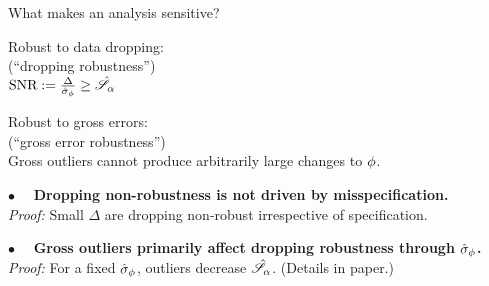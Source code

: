 
\begin{frame}[t]{What makes an analysis sensitive?}
%
\begin{minipage}[t]{0.45\textwidth}
\begin{center}
    Robust to data dropping:\\
    (``dropping robustness'')\\
    \vspace{1em}
    $\textrm{SNR} := \frac{\Delta}{\hat\sigma_{\phi}} \ge \hat{\mathscr{S}}_\alpha$
\end{center}
\end{minipage}
%
\begin{minipage}[t]{0.45\textwidth}
\begin{center}
    Robust to gross errors:\\
    (``gross error robustness'')\\
    \vspace{1em}
    Gross outliers cannot produce
    arbitrarily large changes to $\phi$.
\end{center}
\end{minipage}

\vspace{1em}
\hrulefill

\vspace{1em} $\bullet\quad$
\textbf{Dropping non-robustness is not driven by misspecification.\\}
\textit{Proof: }
Small $\Delta$ are dropping non-robust irrespective of specification.

\vspace{1em} $\bullet\quad$
\textbf{Gross outliers primarily affect dropping robustness through $\hat\sigma_{\phi}$.\\}
\textit{Proof: }
For a fixed $\hat\sigma_{\phi}$, outliers decrease $\hat{\mathscr{S}}_\alpha$.
(Details in paper.)

\end{frame}





